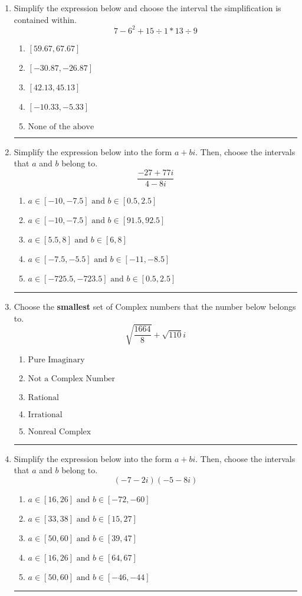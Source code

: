 \documentclass[14pt]{extbook}
\newcommand{\litem}[1]{\item#1\hspace*{-1cm}\rule{\textwidth}{0.4pt}}
\begin{document}
\begin{enumerate}
{\begin{enumerate}[label=\Alph*.]
\end{enumerate} }
\litem{
Simplify the expression below and choose the interval the simplification is contained within.\[ 7 - 6^2 + 15 \div 1 * 13 \div 9 \]\begin{enumerate}[label=\Alph*.]
\item \( [59.67, 67.67] \)
\item \( [-30.87, -26.87] \)
\item \( [42.13, 45.13] \)
\item \( [-10.33, -5.33] \)
\item \( \text{None of the above} \)

\end{enumerate} }
\litem{
Simplify the expression below into the form $a+bi$. Then, choose the intervals that $a$ and $b$ belong to.\[ \frac{-27 + 77 i}{4 - 8 i} \]\begin{enumerate}[label=\Alph*.]
\item \( a \in [-10, -7.5] \text{ and } b \in [0.5, 2.5] \)
\item \( a \in [-10, -7.5] \text{ and } b \in [91.5, 92.5] \)
\item \( a \in [5.5, 8] \text{ and } b \in [6, 8] \)
\item \( a \in [-7.5, -5.5] \text{ and } b \in [-11, -8.5] \)
\item \( a \in [-725.5, -723.5] \text{ and } b \in [0.5, 2.5] \)

\end{enumerate} }
\litem{
Choose the \textbf{smallest} set of Complex numbers that the number below belongs to.\[ \sqrt{\frac{1664}{8}}+\sqrt{110} i \]\begin{enumerate}[label=\Alph*.]
\item \( \text{Pure Imaginary} \)
\item \( \text{Not a Complex Number} \)
\item \( \text{Rational} \)
\item \( \text{Irrational} \)
\item \( \text{Nonreal Complex} \)

\end{enumerate} }
\litem{
Simplify the expression below into the form $a+bi$. Then, choose the intervals that $a$ and $b$ belong to.\[ (-7 - 2 i)(-5 - 8 i) \]\begin{enumerate}[label=\Alph*.]
\item \( a \in [16, 26] \text{ and } b \in [-72, -60] \)
\item \( a \in [33, 38] \text{ and } b \in [15, 27] \)
\item \( a \in [50, 60] \text{ and } b \in [39, 47] \)
\item \( a \in [16, 26] \text{ and } b \in [64, 67] \)
\item \( a \in [50, 60] \text{ and } b \in [-46, -44] \)


\end{enumerate}}
\end{enumerate}
\end{document}
